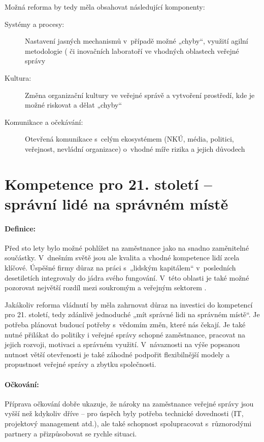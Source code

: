 Možná reforma by tedy měla obsahovat následující komponenty:

\begin{description}
  \item[Systémy a procesy:] Nastavení jasných mechanismů v~případě možné „chyby“, využití agilní metodologie (\cite{christopher_blueprint_2021} či inovačních laboratoří ve vhodných oblastech veřejné správy \cite{cr2030_kvalita_udrzitelnost}
  \item[Kultura:] Změna organizační kultury ve veřejné správě a vytvoření prostředí, kde je možné riskovat a dělat „chyby“
  \item[Komunikace a očekávání:] Otevřená komunikace s~celým ekosystémem (NKÚ, média, politici, veřejnost, nevládní organizace) o~vhodné míře rizika a jejich důvodech
\end{description}

\section*{Kompetence pro 21. století -- správní lidé na správném místě}

\paragraph{Definice:} Před sto lety bylo možné pohlížet na zaměstnance jako na snadno zaměnitelné součástky. V~dnešním světě jsou ale kvalita a vhodné kompetence lidí zcela klíčové. Úspěšné firmy důraz na práci s~„lidským kapitálem“ v~posledních desetiletích integrovaly do jádra svého fungování. V~této oblasti je také možné pozorovat největší rozdíl mezi soukromým a veřejným sektorem \cite{d_eggers_future_2020}.

Jakákoliv reforma vládnutí by měla zahrnovat důraz na investici do kompetencí pro 21. století, tedy zdánlivě jednoduché „mít správné lidi na správném místě“. Je potřeba plánovat budoucí potřeby s~vědomím změn, které nás čekají. Je také nutné přilákat do politiky i veřejné správy schopné zaměstnance, pracovat na jejich rozvoji, motivaci a správném využití. V~návaznosti na výše popsanou nutnost větší otevřenosti je také záhodné podpořit flexibilnější modely a propustnost veřejné správy a zbytku společnosti.

\paragraph{Očkování:} Příprava očkování dobře ukazuje, že nároky na zaměstnance veřejné správy jsou vyšší než kdykoliv dříve -- pro úspěch byly potřeba technické dovednosti (IT, projektový management atd.), ale také schopnost spolupracovat s~různorodými partnery a přizpůsobovat se rychle situaci. 

